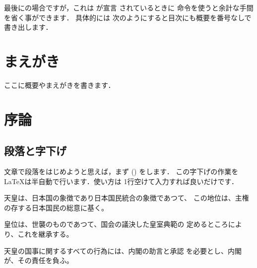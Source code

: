 最後にの場合ですが，これは  が宣言
されているときに 命令を使うと余計な手間を省く事ができます．
具体的には%
次のようにすると目次にも概要を番号なしで書き出します．

\begin{InText}
 
\frontmatter%
\chapter{まえがき}
ここに概要やまえがきを書きます．
\mainmatter%
\chapter{序論}
\end{InText}






\section{段落と字下げ}%
文章で段落をはじめようと思えば，まず () 
をします．%
この字下げの作業を{\LaTeX}は半自動で行います．使い方は
1行空けて入力すれば良いだけです．

\begin{InText}
天皇は、日本国の象徴であり日本国民統合の象徴であつて、
この地位は、主権の存する日本国民の総意に基く。 

皇位は、世襲のものであつて、国会の議決した皇室典範の
定めるところにより、これを継承する。 

天皇の国事に関するすべての行為には、内閣の助言と承認
を必要とし、内閣が、その責任を負ふ。 
\end{InText}



